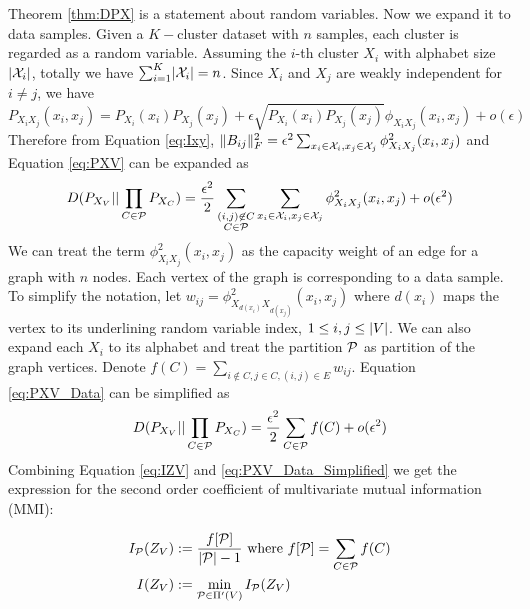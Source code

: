 Theorem \ref{thm:DPX} is a statement about random variables. Now we expand it to data samples. Given a $K-$cluster dataset with $n$ samples, each cluster is regarded as a random variable. 
Assuming the $i$-th cluster $X_i$ with alphabet size $\abs{\mathcal{X}_i}$, totally
we have $\sum_{i=1}^K \abs{\mathcal{X}_i} = n$.
Since $X_i$ and $X_j$ are weakly independent for $i\neq j$, we have
\begin{equation}\label{eq:phi_w}
P_{X_iX_j}(x_i, x_j) = P_{X_i}(x_i)P_{X_j}(x_j) + \epsilon \sqrt{P_{X_i}(x_i)P_{X_j}(x_j)} \phi_{X_iX_j}(x_i, x_j) + o(\epsilon)
\end{equation}
Therefore from Equation \eqref{eq:Ixy}, $\norm{B_{ij}}_F^2 = \epsilon^2 \sum_{x_i \in \mathcal{X}_i, x_j \in \mathcal{X}_j} \phi^2_{X_iX_j}(x_i, x_j)$ and Equation \eqref{eq:PXV} can be expanded as
\begin{equation}\label{eq:PXV_Data}
D(P_{X_V} || \prod_{C\in \P} P_{X_{C}}) = {\epsilon^2\over 2}\sum_{\substack{(i,j) \not\in C\\ C\in \P}} \sum_{x_i \in \mathcal{X}_i, x_j \in \mathcal{X}_j}  \phi^2_{X_iX_j}(x_i, x_j) + o(\epsilon^2)
\end{equation}
We can treat the term $\phi^2_{X_iX_j}(x_i, x_j)$ as the capacity weight of an edge for a graph with $n$ nodes. Each vertex of the graph is corresponding to a data sample.
To simplify the notation, let $w_{ij} = \phi^2_{X_{d(x_i)}X_{d(x_j)}}(x_i, x_j)$ where $d(x_i)$ maps the vertex to its underlining random variable index, $1\leq i,j \leq \abs{V}$.
We can also expand each $X_i$ to its alphabet and treat the partition $\P$ as partition of the graph vertices.
Denote $f(C) = \sum_{i\not\in C, j\in C, (i,j) \in E} w_{ij}$. Equation \eqref{eq:PXV_Data} can be simplified as
\begin{equation}\label{eq:PXV_Data_Simplified}
D(P_{X_V} || \prod_{C\in \P} P_{X_{C}}) = {\epsilon^2\over 2}\sum_{C \in \P} f(C)+ o(\epsilon^2)
\end{equation}
Combining Equation \eqref{eq:IZV} and \eqref{eq:PXV_Data_Simplified} we get the expression for the second order coefficient of multivariate mutual information (MMI):
\begin{definition}\label{def:ms}
	\begin{align}
	I_{\P}(Z_V) & := \frac{ f[\P] }{  \abs{\mathcal{P}} - 1 } \textrm{ where } f[\P] = \sum_{C\in \P}f(C) \label{eq:ms_first}\\
	I(Z_V) & := \min_{\mathcal{P} \in \Pi'(V)} I_{\mathcal{P}}(Z_V)  \label{eq:ms}
	\end{align}
\end{definition}

